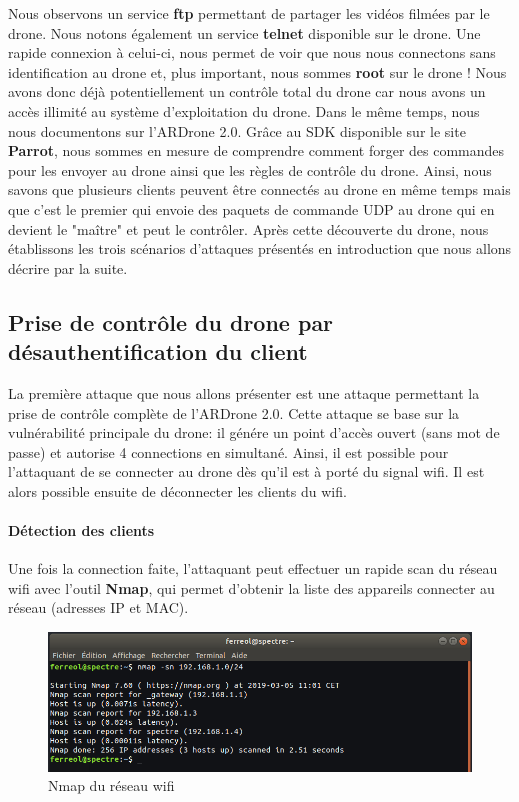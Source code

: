 Nous observons un service \textbf{ftp} permettant de partager les vidéos filmées par le drone. Nous notons également un service \textbf{telnet} disponible sur le drone. Une rapide connexion à celui-ci, nous permet de voir que nous nous connectons sans identification au drone et, plus important, nous sommes \textbf{root} sur le drone ! Nous avons donc déjà potentiellement un contrôle total du drone car nous avons un accès illimité au système d'exploitation du drone.
\newline
Dans le même temps, nous nous documentons sur l'ARDrone 2.0. Grâce au SDK disponible sur le site \textbf{Parrot}, nous sommes en mesure de comprendre comment forger des commandes pour les envoyer au drone ainsi que les règles de contrôle du drone. Ainsi, nous savons que plusieurs clients peuvent être connectés au drone en même temps mais que c'est le premier qui envoie des paquets de commande UDP au drone qui en devient le "maître" et peut le contrôler.
\newline Après cette découverte du drone, nous établissons les trois scénarios d'attaques présentés en introduction que nous allons décrire par la suite.

\subsection{Prise de contrôle du drone par désauthentification du client}
La première attaque que nous allons présenter est une attaque permettant la prise de contrôle complète de l'ARDrone 2.0. Cette attaque se base sur la vulnérabilité principale du drone: il génére un point d'accès ouvert (sans mot de passe) et autorise 4 connections en simultané. Ainsi, il est possible pour l'attaquant de se connecter au drone dès qu'il est à porté du signal wifi. Il est alors possible ensuite de déconnecter les clients du wifi.
\paragraph{Détection des clients}
Une fois la connection faite, l'attaquant peut effectuer un rapide scan du réseau wifi avec l'outil \textbf{Nmap}, qui permet d'obtenir la liste des appareils connecter au réseau (adresses IP et MAC).

\begin{figure}[H]
  \centering
  \includegraphics[scale=0.5]{images/nmap_res}
  \caption{Nmap du réseau wifi}
\end{figure}

